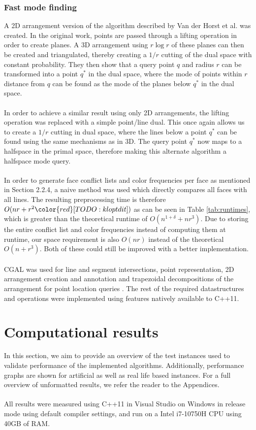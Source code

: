 \documentclass{article}
\newcommand{\todo}[1]{{\color{red}[#1]}}
\begin{document}
\subsubsection{Fast mode finding}
A 2D arrangement version of the algorithm described by Van der Horst et al. was
created. In the original work, points are passed through a lifting operation in
order to create planes. A 3D arrangement using $r \log r$ of these planes can
then be created and triangulated, thereby creating a $1/r$ cutting of the dual
space with constant probability. They then show that a query point $q$ and
radius $r$ can be transformed into a point $q^*$ in the dual space, where the
mode of points within $r$ distance from $q$ can be found as the mode of the
planes below $q^*$ in the dual space. \\\\ In order to achieve a similar result
using only 2D arrangements, the lifting operation was replaced with a simple
point/line dual. This once again allows us to create a $1/r$ cutting in dual
space, where the lines below a point $q^*$ can be found using the same
mechanisms as in 3D. The query point $q^*$ now maps to a halfspace in the
primal space, therefore making this alternate algorithm a halfspace mode query.
\\\\ In order to generate face conflict lists and color frequencies per face as
mentioned in Section 2.2.4, a naive method was used which directly compares all
faces with all lines. The resulting preprocessing time is therefore $O(nr + r^2
    \todo{TODO: klopt dit})$ as can be seen in Table \ref{tab:runtimes}, which is
greater than the theoretical runtime of $O(n^{1+\delta}+nr^3)$. Due to storing
the entire conflict list and color frequencies instead of computing them at
runtime, our space requirement is also $O(nr)$ instead of the theoretical $O(n
    + r^3)$. Both of these could still be improved with a better implementation.
\\\\ CGAL was used for line and segment intersections, point representation, 2D
arrangement creation and annotation and trapezoidal decompositions of the
arrangement for point location queries \cite{cgal:foundations}
\cite{cgal:numbertypes} \cite{cgal:arrangement}. The rest of the required
datastructures and operations were implemented using features natively
available to C++11.
\section{Computational results}
In this section, we aim to provide an overview of the test instances used to
validate performance of the implemented algorithms. Additionally, performance
graphs are shown for artificial as well as real life based instances. For a
full overview of unformatted results, we refer the reader to the Appendices.
\\\\ All results were measured using C++11 in Visual Studio on Windows in
release mode using default compiler settings, and run on a Intel i7-10750H CPU
using 40GB of RAM.
\end{document}
